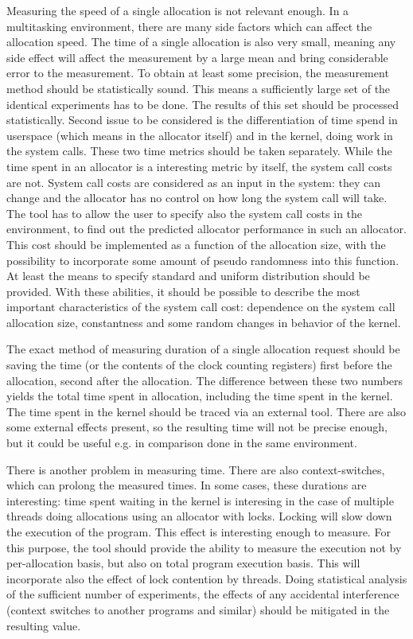 Measuring the speed of a single allocation is not relevant enough. In a
multitasking environment, there are many side factors which can affect the
allocation speed. The time of a single allocation is also very small, meaning any
side effect will affect the measurement by a large mean and bring considerable
error to the measurement. To obtain at least some precision, the measurement
method should be statistically sound. This means a sufficiently large set of the
identical experiments has to be done. The results of this set should be processed
statistically. Second issue to be considered is the differentiation of time spend
in userspace (which means in the allocator itself) and in the kernel, doing work
in the system calls. These two time metrics should be taken separately. While the
time spent in an allocator is a interesting metric by itself, the system call
costs are not. System call costs are considered as an input in the system: they
can change and the allocator has no control on how long the system call will
take. The tool has to allow the user to specify also the system call costs in the
environment, to find out the predicted allocator performance in such an
allocator. This cost should be implemented as a function of the allocation size,
with the possibility to incorporate some amount of pseudo randomness into this
function. At least the means to specify standard and uniform distribution should
be provided. With these abilities, it should be possible to describe the most
important characteristics of the system call cost: dependence on the system call
allocation size, constantness and some random changes in behavior of the kernel.

The exact method of measuring duration of a single allocation request should be
saving the time (or the contents of the clock counting registers) first before
the allocation, second after the allocation. The difference between these two
numbers yields the total time spent in allocation, including the time spent in
the kernel. The time spent in the kernel should be traced via an external tool.
There are also some external effects present, so the resulting time will not be
precise enough, but it could be useful e.g. in comparison done in the same
environment.

There is another problem in measuring time. There are also context-switches,
which can prolong the measured times. In some cases, these durations are
interesting: time spent waiting in the kernel is interesing in the case of
multiple threads doing allocations using an allocator with locks. Locking will
slow down the execution of the program. This effect is interesting enough to
measure. For this purpose, the tool should provide the ability to measure the
execution not by per-allocation basis, but also on total program execution basis.
This will incorporate also the effect of lock contention by threads. Doing
statistical analysis of the sufficient number of experiments, the effects of any
accidental interference (context switches to another programs and similar) should
be mitigated in the resulting value.

